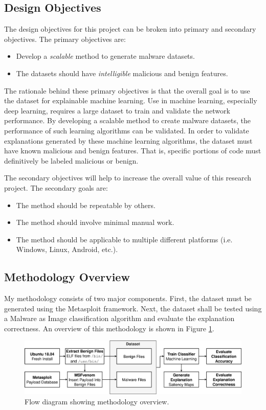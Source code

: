\documentclass[12pt, letterpaper, titlepage]{article}
\newcommand{\figRef}[1]{Figure \ref{#1}}
\newcommand{\metasploit}{Metasploit}
\begin{document}
\subsection{Design Objectives}
The design objectives for this project can be broken into primary and secondary objectives.
The primary objectives are:

\begin{itemize}
  \item Develop a \textit{scalable} method to generate malware datasets.
  \item The datasets should have \textit{intelligible} malicious and benign features.
\end{itemize}

The rationale behind these primary objectives is that the overall goal is to use the dataset for explainable machine learning.
Use in machine learning, especially deep learning, requires a large dataset to train and validate the network performance.
By developing a scalable method to create malware datasets, the performance of such learning algorithms can be validated.
In order to validate explanations generated by these machine learning algorithms, the dataset must have known malicious and benign features.
That is, specific portions of code must definitively be labeled malicious or benign.

The secondary objectives will help to increase the overall value of this research project.
The secondary goals are:

\begin{itemize}
  \item The method should be repeatable by others.
  \item The method should involve minimal manual work.
  \item The method should be applicable to multiple different platforms (i.e. Windows, Linux, Android, etc.).
\end{itemize}

\subsection{Methodology Overview}
My methodology consists of two major components.
First, the dataset must be generated using the \metasploit{} framework.
Next, the dataset shall be tested using a Malware as Image classification algorithm and evaluate the explanation correctness.
An overview of this methodology is shown in \figRef{fig:ProcessOverview}.

\begin{figure}[H]
  \centering
  \includegraphics[width=\textwidth, keepaspectratio]{Images/Process_Overview_Diagram.png}
  \caption{Flow diagram showing methodology overview.}
  \label{fig:ProcessOverview}
\end{figure}
\end{document}

